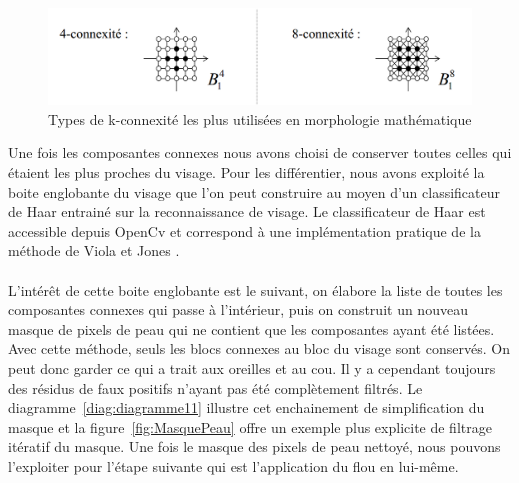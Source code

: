 \documentclass[11pt, french,screen]{report-rd-info}
\begin{document}
\begin{figure}
\centering
\includegraphics[scale=0.5]{Images/connexite}
\caption{Types de k-connexité les plus utilisées en morphologie mathématique}
\label{diag:connexite}
\end{figure}


Une fois les composantes connexes nous avons choisi de conserver toutes celles qui étaient les plus proches du visage. Pour les différentier, nous avons exploité la boite englobante du visage que l'on peut construire au moyen d'un classificateur de Haar entrainé sur la reconnaissance de visage. Le classificateur de Haar est accessible depuis OpenCv et correspond à une implémentation pratique de la méthode de Viola et Jones \cite{Viola2004}.

\paragraph*{}
L'intérêt de cette boite englobante est le suivant, on élabore la liste de toutes les composantes connexes qui passe à l'intérieur, puis on construit un nouveau masque de pixels de peau qui ne contient que les composantes ayant été listées. Avec cette méthode, seuls les blocs connexes au bloc du visage sont conservés. On peut donc garder ce qui a trait aux oreilles et au cou. Il y a cependant toujours des résidus de faux positifs n'ayant pas été complètement filtrés. Le diagramme~\ref{diag:diagramme11} illustre cet enchainement de simplification du masque et la figure~\ref{fig:MasquePeau} offre un exemple plus explicite de filtrage itératif du masque. Une fois le masque des pixels de peau nettoyé, nous pouvons l'exploiter pour l'étape suivante qui est l'application du flou en lui-même.
\end{document}
